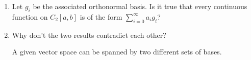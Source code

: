 \documentclass[12pt,letterpaper,reqno]{amsart}
\begin{document}
\begin{enumerate}[1.]
\begin{enumerate}
\begin{flushleft}
\end{flushleft}
\item Let $g_i$ be the associated orthonormal basis.  Is it true that every continuous function on $C_2[a,b]$ is of the form $\sum_{i=0}^\infty a_ig_i$? 
\item Why don't the two results contradict each other?
\begin{flushleft}
A given vector space can be spanned by two different sets of bases.
\end{flushleft}
\end{enumerate}
\end{enumerate}
\end{document}
